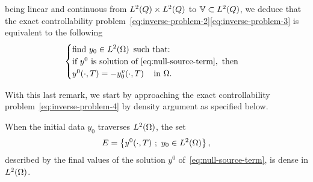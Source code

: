 \begin{remarque}
\begin{equation*}
    \end{equation*}
    being linear and continuous from $L^{2}\!\left({Q}\right)\times L^{2}\!\left({Q}\right)$ to
    $\mathbb{V}\subset L^{2}\!\left({Q}\right)$, we deduce that the exact controllability
    problem~\eqref{eq:inverse-problem-2}\eqref{eq:inverse-problem-3} is
    equivalent to the following
    \begin{equation}\label{eq:inverse-problem-4}
        \begin{cases}\displaystyle
            \text{find}\ y_{0}\in L^{2}\!\left({\Omega}\right)\ \text{such that:}\\
            \text{if}\ y^{0}\ \text{is solution
            of}~\eqref{eq:null-source-term},\ \text{then}\\
            y^{0}\!\left({\cdot,T}\right) = -y_{0}^{v}\!\left({\cdot,
            T}\right)\quad \text{in}\ \Omega.
        \end{cases}
    \end{equation}
\end{remarque}

With this last remark, we start by approaching the exact controllability
problem~\eqref{eq:inverse-problem-4} by density argument as specified
below.

\begin{proposition}\label{propo:controllability-result-1}%
    When the initial data $y_{0}$ traverses $L^{2}\!\left({\Omega}\right)$, the set
    \begin{equation*}\label{eq:controllability-result-1}
        E = \left\{{%
            y^{0}\!\left({\cdot,T}\right)\,;\ y_{0}\in\Ldeux{\Omega}
        }\right\},
    \end{equation*}
    described by the final values of the solution $y^{0}$
    of~\eqref{eq:null-source-term}, is dense in $L^{2}\!\left({\Omega}\right)$.
\end{proposition}

